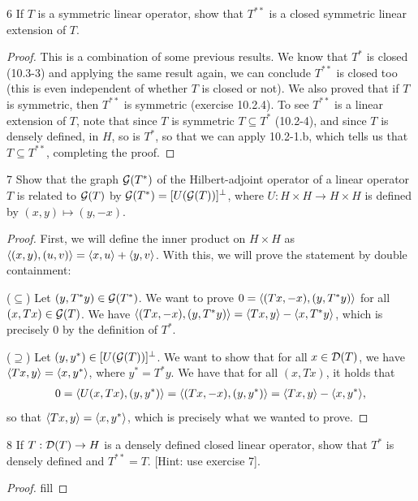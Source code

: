 \begin{exercise}{6}
If $T$ is a symmetric linear operator, show that $T^{\ast \ast}$ is a closed symmetric linear extension of $T$.
\end{exercise}
\begin{proof}
This is a combination of some previous results.
We know that $T^\ast$ is closed (10.3-3) and applying the same result again, we can conclude $T^{\ast \ast}$ is closed too (this is even independent of whether $T$ is closed or not).
We also proved that if $T$ is symmetric, then $T^{\ast \ast}$ is symmetric (exercise 10.2.4).
To see $T^{\ast \ast}$ is a linear extension of $T$, note that since $T$ is symmetric $T \subseteq T^\ast$ (10.2-4), and since $T$ is densely defined, in $H$, so is $T^\ast$, so that we can apply 10.2-1.b, which tells us that $T \subseteq T^{\ast \ast}$, completing the proof.
\end{proof} 

\begin{exercise}{7}
Show that the graph $\mathcal{G}(T^\ast)$ of the Hilbert-adjoint operator of a linear operator $T$ is related to $\mathcal{G}(T)$ by $\mathcal{G}(T^\ast) = [U(\mathcal{G}(T))]^\perp$, where $U: H \times H \to H \times H$ is defined by $(x, y) \mapsto (y, -x)$.
\end{exercise}
\begin{proof}
First, we will define the inner product on $H \times H$ as $\langle (x, y), (u, v)\rangle = \langle x, u\rangle + \langle y, v\rangle$.
With this, we will prove the statement by double containment:

($\subseteq$)
Let $(y, T^\ast y) \in \mathcal{G}(T^\ast)$.
We want to prove $0 = \langle (Tx, -x), (y, T^\ast y)\rangle$ for all $(x, Tx) \in \mathcal{G}(T)$.
We have $\langle (Tx, -x), (y, T^\ast y)\rangle = \langle Tx, y\rangle - \langle x, T^\ast y\rangle$, which is precisely 0 by the definition of $T^\ast$.

($\supseteq$)
Let $(y, y^\ast) \in [U(\mathcal{G}(T))]^\perp$.
We want to show that for all $x \in \mathcal{D}(T)$, we have $\langle Tx, y\rangle = \langle x, y^\ast\rangle$, where $y^\ast = T^\ast y$.
We have that for all $(x, Tx)$, it holds that 
\begin{align*}
    0 
    = \langle U(x, Tx), (y, y^\ast)\rangle 
    = \langle (Tx, -x), (y, y^\ast)\rangle
    = \langle Tx, y\rangle - \langle x, y^\ast\rangle,
\end{align*}
so that $\langle Tx, y\rangle = \langle x, y^\ast\rangle$, which is precisely what we wanted to prove.
\end{proof} 

\begin{exercise}{8}
If $T: \mathcal{D}(T) \to H$ is a densely defined closed linear operator, show that $T^\ast$ is densely defined and $T^{\ast \ast} = T$.
[Hint: use exercise 7].
\end{exercise}
\begin{proof}
fill
\end{proof} 

